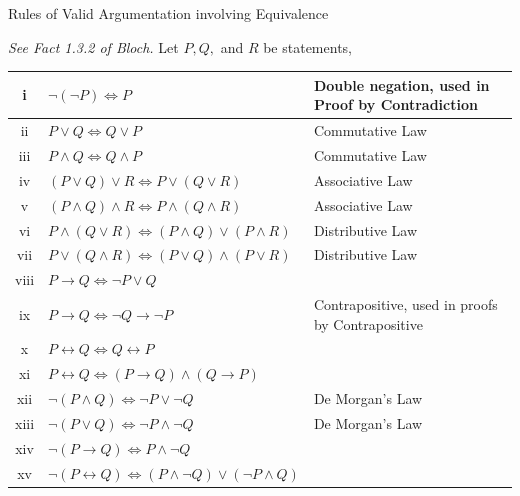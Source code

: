 \documentclass{article}
\begin{document}
	\vspace{.25cm}

	\centerline{\large{Rules of Valid Argumentation involving Equivalence}}

	\vspace{.25cm}

	\emph{See Fact 1.3.2 of Bloch.}
	Let $P, Q,$ and $R$ be statements,


	\begin{tabular}{|c|l|p{3in}|}
		\hline
		i  & $\neg(\neg P)\Leftrightarrow P$                                                & Double negation, used in Proof by Contradiction  \\ \hline
		ii   & $P\vee Q\Leftrightarrow Q\vee P$                                               & Commutative Law                                  \\\hline
		iii  & $P\wedge Q\Leftrightarrow Q\wedge P$                                           & Commutative Law                                  \\\hline
		iv   & $(P\vee Q)\vee R\Leftrightarrow P\vee(Q\vee R)$                                & Associative Law                                  \\\hline
		v    & $(P\wedge Q)\wedge R\Leftrightarrow P\wedge(Q\wedge R)$                        & Associative Law                                  \\\hline
		vi   & $P\wedge(Q\vee R)\Leftrightarrow (P\wedge Q)\vee(P\wedge R)$                   & Distributive Law                                 \\\hline
		vii  & $P\vee (Q\wedge R)\Leftrightarrow (P\vee Q)\wedge(P\vee R)$                    & Distributive Law                                 \\\hline
		viii & $P\rightarrow Q\Leftrightarrow \neg P\vee Q$                                   &                                                  \\\hline
		ix   & $P\rightarrow Q\Leftrightarrow \neg Q\rightarrow \neg P$                       & Contrapositive, used in proofs by Contrapositive \\\hline
		x    & $P\leftrightarrow Q\Leftrightarrow Q\leftrightarrow P$                         &                                                  \\\hline
		xi   & $P\leftrightarrow Q\Leftrightarrow (P\rightarrow Q)\wedge (Q\rightarrow P)$    &                                                  \\\hline
		xii  & $\neg(P\wedge Q)\Leftrightarrow \neg P\vee\neg Q$                              & De Morgan's Law                                  \\\hline
		xiii & $\neg(P\vee Q)\Leftrightarrow \neg P\wedge\neg Q$                              & De Morgan's Law                                  \\\hline
		xiv  & $\neg(P\rightarrow Q)\Leftrightarrow P\wedge \neg Q$                           &                                                  \\\hline
		xv   & $\neg(P\leftrightarrow Q)\Leftrightarrow (P\wedge \neg Q)\vee(\neg P\wedge Q)$ & \\\hline
	\end{tabular}
\end{document}
